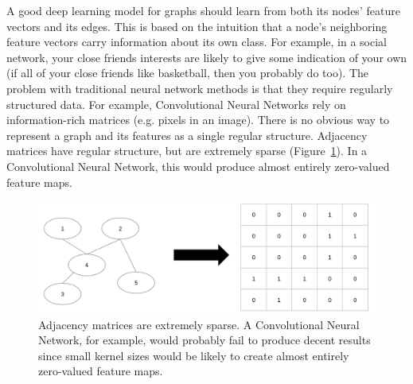 A good deep learning model for graphs should learn from both its nodes' feature vectors and its edges. This is based on the intuition that a node's neighboring feature vectors carry information about its own class. For example, in a social network, your close friends interests are likely to give some indication of your own (if all of your close friends like basketball, then you probably do too). The problem with traditional neural network methods is that they require regularly structured data. For example, Convolutional Neural Networks rely on information-rich matrices (e.g. pixels in an image). There is no obvious way to represent a graph and its features as a single regular structure. Adjacency matrices have regular structure, but are extremely sparse (Figure~\ref{fig:sparse}). In a Convolutional Neural Network, this would produce almost entirely zero-valued feature maps. 

\begin{figure}[h!]
	\centering
	\includegraphics[width=1\linewidth]{media/sparse.png} 
	\caption{Adjacency matrices are extremely sparse. A Convolutional Neural Network, for example, would probably fail to produce decent results since small kernel sizes would be likely to create almost entirely zero-valued feature maps.}
	\label{fig:sparse}
\end{figure}
